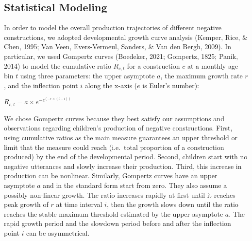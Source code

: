 \documentclass[
  man,floatsintext]{apa6}
\begin{document}
\subsection{Statistical Modeling}\label{statistical-modeling}

In order to model the overall production trajectories of different negative constructions, we adopted developmental growth curve analysis (Kemper, Rice, \& Chen, 1995; Van Veen, Evers-Vermeul, Sanders, \& Van den Bergh, 2009). In particular, we used Gompertz curves (Boedeker, 2021; Gompertz, 1825; Panik, 2014) to model the cumulative ratio \(R_{c,t}\) for a construction \(c\) at a monthly age bin \(t\) using three parameters: the upper asymptote \(a\), the maximum growth rate \(r\), and the inflection point \(i\) along the x-axis (\(e\) is Euler's number):

\(R_{c, t} = a \times e^{-e^{(-r \times (t - i))}}\)

We chose Gompertz curves because they best satisfy our assumptions and observations regarding children's production of negative constructions. First, using cumulative ratios as the main measure guarantees an upper threshold or limit that the measure could reach (i.e.~total proportion of a construction produced) by the end of the developmental period. Second, children start with no negative utterances and slowly increase their production. Third, this increase in production can be nonlinear. Similarly, Gompertz curves have an upper asymptote \(a\) and in the standard form start from zero. They also assume a possibly non-linear growth. The ratio increases rapidly at first until it reaches peak growth of \(r\) at time interval \(i\), then the growth slows down until the ratio reaches the stable maximum threshold estimated by the upper asymptote \(a\). The rapid growth period and the slowdown period before and after the inflection point \(i\) can be asymmetrical.
\end{document}
